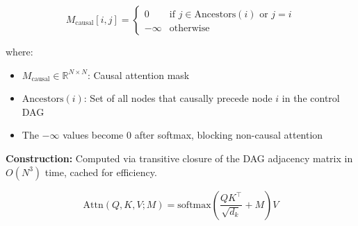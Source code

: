
\begin{equation}
\label{eq:causal_mask}
M_{\text{causal}}[i,j] = \begin{cases}
    0 & \text{if } j \in \text{Ancestors}(i) \text{ or } j = i \\
    -\infty & \text{otherwise}
\end{cases}
\end{equation}

\noindent where:
\begin{itemize}
    \item $M_{\text{causal}} \in \mathbb{R}^{N \times N}$: Causal attention mask
    \item $\text{Ancestors}(i)$: Set of all nodes that causally precede node $i$ in the control DAG
    \item The $-\infty$ values become 0 after softmax, blocking non-causal attention
\end{itemize}

\textbf{Construction:} Computed via transitive closure of the DAG adjacency matrix in $O(N^3)$ time, cached for efficiency.




\begin{equation}
\label{eq:attention}
\text{Attn}(Q, K, V; M) = \text{softmax}\left( \frac{QK^\top}{\sqrt{d_k}} + M \right) V
\end{equation}

